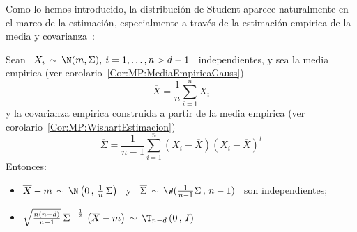Como lo hemos introducido, la  distribuci\'on de Student aparece naturalmente en
el  marco  de la  estimaci\'on,  especialmente  a  trav\'es de  la  estimaci\'on
empirica de la media y covarianza~\cite{Mui82, GupNag99, BilBre99, And03, Seb04}:
%
\begin{teorema}%
%
  Sean  \  $X_i \,  \sim  \,  \N(m,\Sigma), \:  i  =  1, \ldots  ,  n  > d-1$  \
  independientes,       y      sea       la       media      empirica       (ver
  corolario~\ref{Cor:MP:MediaEmpiricaGauss})
  \[
  \overline{X} = \frac{1}{n} \sum_{i=1}^n X_i
  \]
  y  la  covarianza empirica  construida  a partir  de  la  media empirica  (ver
  corolario~\ref{Cor:MP:WishartEstimacion})
  \[
  \overline{\Sigma}  =  \frac{1}{n-1}  \sum_{i=1}^n  \left( X_i  -  \overline{X}
  \right) \left( X_i - \overline{X} \right)^t
  \]
  Entonces:
  \begin{itemize}
  \item $\overline{X} -  m \, \sim \,  \N\left( 0 \, , \,  \frac{1}{n} \, \Sigma
    \right)$ \ y  \ $\overline{\Sigma} \, \sim \, \W(  \frac{1}{n-1} \Sigma \, ,
    \, n-1 ) $ \ son independientes;
  \item $\sqrt{\frac{n (n-d)}{n-1}} \: \overline{\Sigma}^{\, -\frac12} \, \left(
      \overline{X} - m \right) \, \sim \, \T_{n-d}\left( 0 \, , \, I \right)$
  \end{itemize}
\end{teorema}
%
